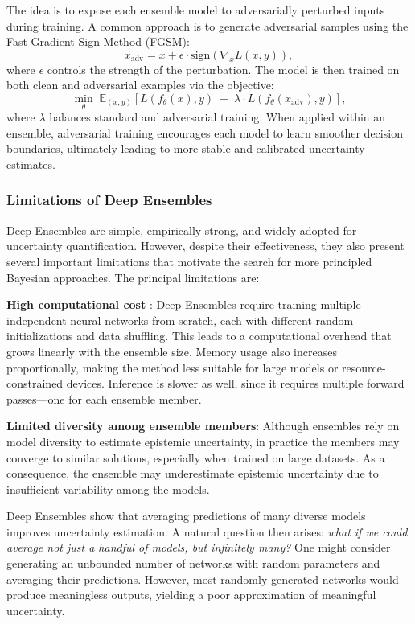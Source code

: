 The idea is to expose each ensemble model to adversarially perturbed inputs during training. A common approach is to generate adversarial samples using the Fast Gradient Sign Method (FGSM):
\[
x_{\text{adv}} = x + \epsilon \cdot \mathrm{sign}(\nabla_x L(x, y)),
\]
where $\epsilon$ controls the strength of the perturbation. The model is then trained on both clean and adversarial examples via the objective:
\[
\min_{\theta} \; \mathbb{E}_{(x, y)} \left[ L(f_{\theta}(x), y) \;+\; \lambda \cdot L(f_{\theta}(x_{\text{adv}}), y) \right],
\]
where $\lambda$ balances standard and adversarial training.  
When applied within an ensemble, adversarial training encourages each model to learn smoother decision boundaries, ultimately leading to more stable and calibrated uncertainty estimates.

\subsubsection{Limitations of Deep Ensembles}

Deep Ensembles are simple, empirically strong, and widely adopted for uncertainty quantification. 
However, despite their effectiveness, they also present several important limitations that motivate 
the search for more principled Bayesian approaches. The principal limitations are:
\begin{compactitemize}
    \item \textbf{High computational cost }: Deep Ensembles require training multiple independent neural networks from scratch, each with different random initializations and data shuffling. This leads to a computational overhead that grows linearly with the ensemble size. Memory usage also increases proportionally, making the method less suitable for large models or resource-constrained devices. Inference is slower as well, since it requires multiple forward passes—one for each ensemble member.

    \item \textbf{Limited diversity among ensemble members}: Although ensembles rely on model diversity to estimate epistemic uncertainty, in practice the members may converge to similar solutions, especially when trained on large datasets. As a consequence, the ensemble may underestimate epistemic uncertainty due to insufficient variability among the models.
\end{compactitemize}

Deep Ensembles show that averaging predictions of many diverse models improves uncertainty estimation. A natural question then arises: \emph{what if we could average not just a handful of models, but infinitely many?}  
One might consider generating an unbounded number of networks with random parameters and averaging their predictions. However, most randomly generated networks would produce meaningless outputs, yielding a poor approximation of meaningful uncertainty.

